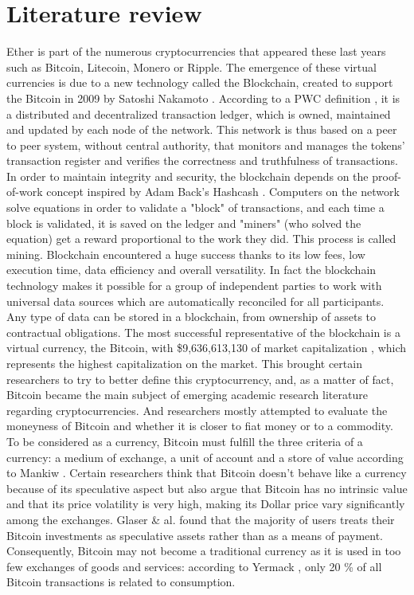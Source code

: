\documentclass[11pt]{report}
\begin{document}
\clearpage
\chapter*{Literature review}

Ether is part of the numerous cryptocurrencies that appeared these last years such as Bitcoin, Litecoin, Monero or Ripple. The emergence of these virtual currencies is due to a new technology called the Blockchain, created to support the Bitcoin in 2009 by Satoshi Nakamoto \cite{SATOSHI}.\newline
According to a PWC definition \cite{PWC}, it is a distributed and decentralized transaction ledger, which is owned, maintained and updated by each node of the network. This network is thus based on a peer to peer system, without central authority, that monitors and manages the tokens' transaction register and verifies the correctness and truthfulness of transactions. \smallbreak
In order to maintain integrity and security, the blockchain depends on the proof-of-work concept inspired by Adam Back's Hashcash \cite{ADAM}. Computers on the network solve equations in order to validate a "block" of transactions, and each time a block is validated, it is saved on the ledger and "miners" (who solved the equation) get a reward proportional to the work they did. This process is called mining.\smallbreak
Blockchain encountered a huge success thanks to its low fees, low execution time, data efficiency and overall versatility. In fact the blockchain technology makes it possible for a group of independent parties to work with universal data sources which are automatically reconciled for all participants. Any type of data can be stored in a blockchain, from ownership of assets to contractual obligations. The most successful representative of the blockchain is a virtual currency, the Bitcoin, with \$9,636,613,130 of market capitalization \cite{CRYPTOCOMPARE}, which represents the highest capitalization on the market. \clearpage
This brought certain researchers to try to better define this cryptocurrency, and, as a matter of fact, Bitcoin became the main subject of emerging academic research literature regarding cryptocurrencies. And researchers mostly attempted to evaluate the moneyness of Bitcoin and whether it is closer to fiat money or to a commodity. \smallbreak
To be considered as a currency, Bitcoin must fulfill the three criteria of a currency: a medium of exchange, a unit of account and a store of value according to Mankiw \cite{MANKIW}. Certain  researchers think that Bitcoin doesn’t behave like a currency because of its speculative aspect\cite{VELDE}\cite{HANLEY}\cite{WILLIAMS} but also argue that Bitcoin has no intrinsic value and that its price volatility is very high, making its Dollar price vary significantly among the exchanges. Glaser \& al. \cite{GLASER} found that the majority of users treats their Bitcoin investments as speculative assets rather than as a means of payment. Consequently, Bitcoin may not become a traditional currency as it is used in too few exchanges of goods and services: according to Yermack \cite{YERMACK}, only 20 \% of all Bitcoin transactions is related to consumption. 
\end{document}
